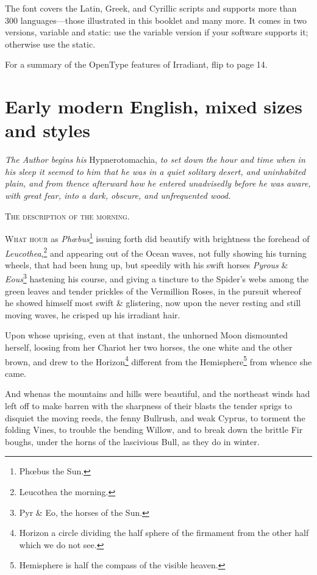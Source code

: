 \documentclass[12pt]{book}
\begin{document}
The font covers the Latin, Greek, and Cyrillic scripts and supports
more than 300 languages---those illustrated in this booklet and many more. It
comes in two versions, variable and static: use the variable version
if your software supports it; otherwise use the static.

For a summary of the OpenType features of Irradiant, flip to page 14.


\section*{Early modern English, mixed sizes and styles}

\noindent\textit{The Author begins his} Hypnerotomachia, \textit{to set
  down the hour and time when in his sleep it seemed to him that
  he was in a quiet solitary desert, and uninhabited plain, and
  from thence afterward how he entered unadvisedly before he was
  aware, with great fear, into a dark, obscure, and unfrequented
  wood.}

\begin{center}
  \textsc{The description of the morning.}
\end{center}

\lettrine[lines=5, loversize=0.1, findent=5pt, nindent=0em, image=true]{W}{hat hour} as \textit{Phœbus}\footnote{Phœbus the Sun.} issuing
forth did beautify with brightness the forehead of
\textit{Leucothea},\footnote{Leucothea the morning.} and appearing out
of the Ocean waves, not fully showing his turning wheels, that had
been hung up, but speedily with his swift horses \textit{Pyrous} \&
\textit{Eous}\footnote{Pyr \& Eo, the horses of the Sun.} hastening
his course, and giving a tincture to the Spider’s webs among the
green leaves and tender prickles of the Vermillion Roses, in the
pursuit whereof he showed himself most swift \& glistering, now upon
the never resting and still moving waves, he crisped up his irradiant
hair.

Upon whose uprising, even at that instant, the unhorned Moon
dismounted herself, loosing from her Chariot her two horses, the one
white and the other brown, and drew to the Horizon\footnote{Horizon
  a circle dividing the half sphere of the firmament from the other
  half which we do not see.} different from the
Hemisphere\footnote{Hemisphere is half the compass of the visible
  heaven.} from whence she came.

And whenas the mountains and hills were beautiful, and the
northeast winds had left off to make barren with the sharpness of
their blasts the tender sprigs to disquiet the moving reeds, the
fenny Bullrush, and weak Cyprus, to torment the folding Vines, to
trouble the bending Willow, and to break down the brittle Fir
boughs, under the horns of the lascivious Bull, as they do in
winter.
\end{document}
